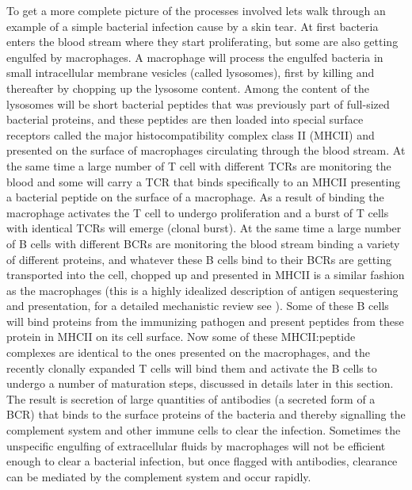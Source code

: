 To get a more complete picture of the processes involved lets walk through an example of a simple bacterial infection cause by a skin tear.
At first bacteria enters the blood stream where they start proliferating, but some are also getting engulfed by macrophages.
A macrophage will process the engulfed bacteria in small intracellular membrane vesicles (called lysosomes), first by killing and thereafter by chopping up the lysosome content.
Among the content of the lysosomes will be short bacterial peptides that was previously part of full-sized bacterial proteins, and these peptides are then loaded into special surface receptors called the major histocompatibility complex class II (MHCII) and presented on the surface of macrophages circulating through the blood stream.
At the same time a large number of T cell with different TCRs are monitoring the blood and some will carry a TCR that binds specifically to an MHCII presenting a bacterial peptide on the surface of a macrophage.
As a result of binding the macrophage activates the T cell to undergo proliferation and a burst of T cells with identical TCRs will emerge (clonal burst).
At the same time a large number of B cells with different BCRs are monitoring the blood stream binding a variety of different proteins, and whatever these B cells bind to their BCRs are getting transported into the cell, chopped up and presented in MHCII is a similar fashion as the macrophages (this is a highly idealized description of antigen sequestering and presentation, for a detailed mechanistic review see \cite{batista2009and}).
Some of these B cells will bind proteins from the immunizing pathogen and present peptides from these protein in MHCII on its cell surface.
Now some of these MHCII:peptide complexes are identical to the ones presented on the macrophages, and the recently clonally expanded T cells will bind them and activate the B cells to undergo a number of maturation steps, discussed in details later in this section.
The result is secretion of large quantities of antibodies (a secreted form of a BCR) that binds to the surface proteins of the bacteria and thereby signalling the complement system and other immune cells to clear the infection.
Sometimes the unspecific engulfing of extracellular fluids by macrophages will not be efficient enough to clear a bacterial infection, but once flagged with antibodies, clearance can be mediated by the complement system and occur rapidly.

